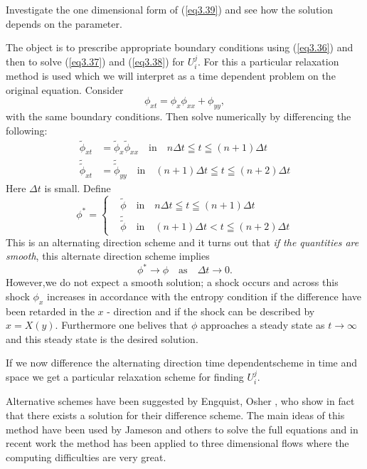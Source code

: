 \begin{exer*}
Investigate the one dimensional form of (\ref{eq3.39}) and see how the solution depends on the parameter. 
\end{exer*}

The object is to prescribe appropriate boundary conditions using (\ref{eq3.36}) and then to solve (\ref{eq3.37}) and (\ref{eq3.38}) for $U^j_i$. For this a particular relaxation method is used which we will interpret as a time dependent problem on the original equation. Consider 
$$
\phi_{xt} = \phi_x \phi_{xx} + \phi_{yy},
$$
with the same boundary conditions. Then solve numerically by differencing the following:
\begin{align*}
\tilde{\phi}_{xt} & = \tilde{\phi}_x \tilde{\phi}_{xx} \quad \text{in} \quad n \Delta t \leqq t \leqq (n+1) \Delta t\tag{3.40}\label{eq3.40}\\
\tilde{\tilde{\phi}}_{xt} & = \tilde{\tilde{\phi}}_{yy} \quad \text{in} \quad (n+1) \Delta t \leqq t \leqq (n+2) \Delta t \tag{3.41}\label{eq3.41}
\end{align*}
Here $\Delta t$ is small. Define
\begin{equation*}
\phi^* = 
\begin{cases}
& \tilde{\phi} \quad \text{in} \quad n \Delta t \leqq t \leqq (n+1) \Delta t\\
& \tilde{\tilde{\phi}} \quad\text{in}\quad (n+1) \Delta t < t \leqq (n+2) \Delta t
\end{cases}\tag{3.42}\label{eq3.42}
\end{equation*}
This is an alternating direction scheme and it turns out that {\em if the quantities are smooth}, this alternate direction scheme implies
$$
\phi^* \to \phi \quad \text{as} \quad \Delta t \to 0.
$$
However,\pageoriginale we do not expect a smooth solution; a shock occurs and across this shock $\phi_x$ increases in accordance with the entropy condition if the difference have been retarded in the $x$ - direction and if the shock can be described by $x = X(y)$. Furthermore one belives that $\phi$ approaches a steady state as $t \to \infty$ and this steady state is the desired solution.

If we now difference the alternating direction time dependent\break scheme
in time and space we get a particular relaxation scheme for finding
$U^j_i$. 

Alternative schemes have been suggested by Engquist, Osher \cite{key9}, who show in fact that there exists a solution for their difference scheme. The main ideas of this method have been used by Jameson \cite{key18} and others to solve the full equations and in recent work the method has been applied to three dimensional flows where the computing difficulties are very great.

